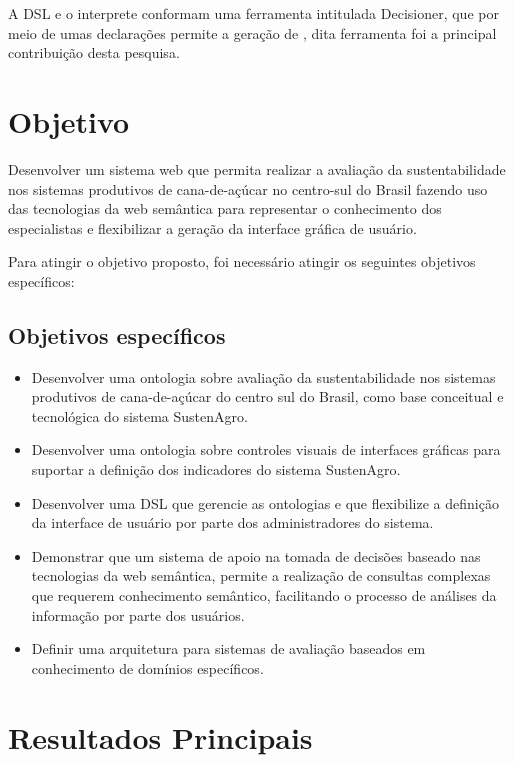 A DSL e o interprete conformam uma ferramenta intitulada Decisioner,
que por meio de umas declarações permite a geração de ,
dita ferramenta foi a principal contribuição desta pesquisa.

\section{Objetivo}

Desenvolver um sistema web que permita realizar a avaliação da sustentabilidade
nos sistemas produtivos de cana-de-açúcar no centro-sul do Brasil
fazendo uso das tecnologias da web semântica para representar o conhecimento
dos especialistas e flexibilizar a geração da interface gráfica de
usuário.

Para atingir o objetivo proposto, foi necessário atingir os seguintes
objetivos específicos: 

\subsection*{Objetivos específicos}
\begin{itemize}
\item Desenvolver uma ontologia sobre avaliação da sustentabilidade nos
sistemas produtivos de cana-de-açúcar do centro sul do Brasil, como
base conceitual e tecnológica do sistema SustenAgro.
\item Desenvolver uma ontologia sobre controles visuais de interfaces gráficas
para suportar a definição dos indicadores do sistema SustenAgro.
\item Desenvolver uma DSL que gerencie as ontologias e que flexibilize a
definição da interface de usuário por parte dos administradores do
sistema.
\item Demonstrar que um sistema de apoio na tomada de decisões baseado nas
tecnologias da web semântica, permite a realização de consultas complexas
que requerem conhecimento semântico, facilitando o processo de análises
da informação por parte dos usuários.
\item Definir uma arquitetura para sistemas de avaliação baseados em conhecimento
de domínios específicos.
\end{itemize}

\section{Resultados Principais}

